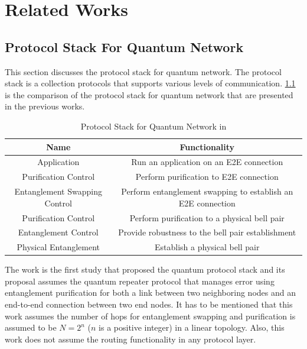 \chapter{Related Works}
\label{related works}

\section{Protocol Stack For Quantum Network}

This section discusses the protocol stack for quantum network. The protocol stack is a collection protocols that supports various levels of communication.
\ref{related-works:rdv} is the comparison of the protocol stack for quantum network that are presented in the previous works.

\begin{table}[ht]
  \begin{center}
    \begin{tabular}{|c|c|} \hline
       Name & Functionality \\ \hline \cline{1-2}
       Application & Run an application on an E2E connection \\ \hline \cline{1-2}
       Purification Control & Perform purification to E2E connection \\ \hline \cline{1-2}
       Entanglement Swapping Control & Perform entanglement swapping to establish an E2E connection \\
       Purification Control & Perform purification to a physical bell pair \\ \hline \cline{1-2} \hline \cline{1-2}
       Entanglement Control & Provide robustness to the bell pair establishment \\ \hline \cline{1-2} \hline \cline{1-2}
       Physical Entanglement & Establish a physical bell pair \\ \hline \cline{1-2} \hline \cline{1-2}
    \end{tabular}
    \caption{Protocol Stack for Quantum Network in \cite{Van_Meter_2009}}
  \end{center}
  \label{related-works:rdv}
\end{table}

The work \cite{Van_Meter_2009} is the first study that proposed the quantum protocol stack and its proposal assumes the quantum repeater protocol that manages error using entanglement purification for both a link between two neighboring nodes and an end-to-end connection between two end nodes.
It has to be mentioned that this work assumes the number of hops for entanglement swapping and purification is assumed to be $N = 2^n$ ($n$ is a positive integer) in a linear topology. Also, this work does not assume the routing functionality in any protocol layer.

